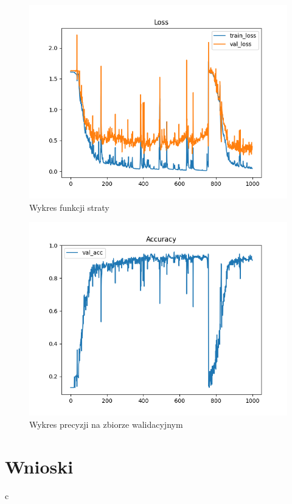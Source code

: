 \documentclass[10pt]{article}
\begin{document}
\begin{figure}
  \includegraphics[width=13cm]{loss.png}
  \centering
  \caption{Wykres funkcji straty}
\end{figure}

\begin{figure}
  \includegraphics[width=13cm]{acc.png}
  \centering
  \caption{Wykres precyzji na zbiorze walidacyjnym}
\end{figure}

\section{Wnioski}

c
\end{document}
